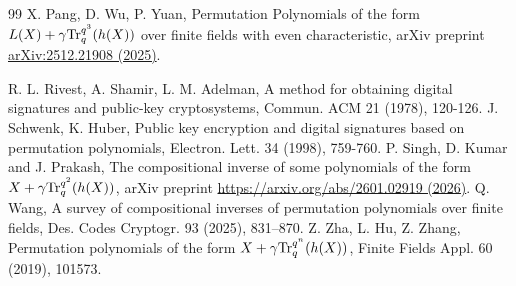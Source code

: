 \documentclass[11pt]{amsart}
\theoremstyle{plain}
\numberwithin{equation}{section}
\theoremstyle{definition}
\def\Tr{{\rm Tr}}
\begin{document}
\begin{thebibliography}{99}
 X. Pang, D. Wu, P. Yuan, Permutation Polynomials of the form $ L (X)+\gamma \Tr_q^{q^ 3}(h (X)) $ over finite fields with even characteristic, arXiv preprint  \href{https://arxiv.org/pdf/2512.21908} {arXiv:2512.21908 (2025)}.

 R. L. Rivest, A. Shamir, L. M. Adelman, A method for obtaining digital signatures and public-key cryptosystems, Commun. ACM 21 (1978), 120-126.
 J. Schwenk, K. Huber,  Public key encryption and digital signatures based on permutation polynomials, Electron. Lett. 34 (1998), 759-760.
P. Singh, D. Kumar and J. Prakash, The compositional inverse of some polynomials of the form $X+ \gamma \Tr_q^{q^2} (h (X))$, arXiv preprint \href{https://doi.org/10.48550/arXiv.2601.02919}{https://arxiv.org/abs/2601.02919 (2026)}.
 Q. Wang, A survey of compositional inverses of permutation polynomials over finite fields, Des. Codes Cryptogr. 93 (2025), 831--870.
 Z. Zha, L. Hu, Z. Zhang, Permutation polynomials of the form $X+ \gamma \Tr_q^{q^n} (h (X))$, Finite Fields Appl. 60 (2019), 101573.


 \end{thebibliography}
 
\end{document}
